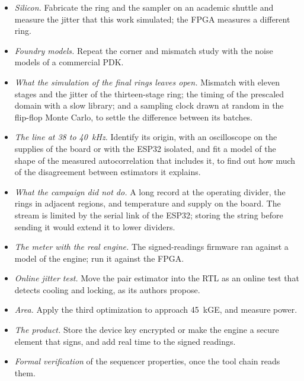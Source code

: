 \begin{itemize}
\item \emph{Silicon.} Fabricate the ring and the sampler on an academic
shuttle and measure the jitter that this work simulated; the \ac{FPGA}
measures a different ring.
\item \emph{Foundry models.} Repeat the corner and mismatch study with the
noise models of a commercial \ac{PDK}.
\item \emph{What the simulation of the final rings leaves open.} Mismatch
with eleven stages and the jitter of the thirteen-stage ring; the timing
of the prescaled domain with a slow library; and a sampling clock drawn
at random in the flip-flop Monte Carlo, to settle the difference between
its batches.
\item \emph{The line at 38 to 40~kHz.} Identify its origin, with an
oscilloscope on the supplies of the board or with the ESP32 isolated, and
fit a model of the shape of the measured autocorrelation that includes
it, to find out how much of the disagreement between estimators it
explains.
\item \emph{What the campaign did not do.} A long record at the operating
divider, the rings in adjacent regions, and temperature and supply on the
board. The stream is limited by the serial link of the ESP32; storing the
string before sending it would extend it to lower dividers.
\item \emph{The meter with the real engine.} The signed-readings firmware
ran against a model of the engine; run it against the \ac{FPGA}.
\item \emph{Online jitter test.} Move the pair estimator into the RTL as an
online test that detects cooling and locking, as its authors propose.
\item \emph{Area.} Apply the third optimization to approach 45~kGE, and
measure power.
\item \emph{The product.} Store the device key encrypted or make the
engine a secure element that signs, and add real time to the signed
readings.
\item \emph{Formal verification} of the sequencer properties, once the
tool chain reads them.
\end{itemize}
